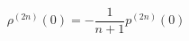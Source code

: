 \begin{equation}
{\rho}^{(2n)}\left( 0\right)=-\frac{1}{n+1}{p}^{(2n)}\left( 0\right) 
\end{equation}

